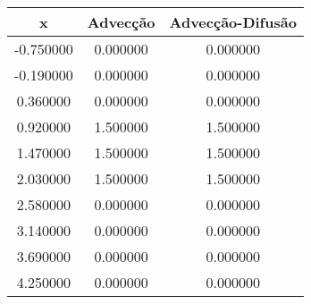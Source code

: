 \begin{tabular}{ccc}
\toprule
x & Advecção & Advecção-Difusão \\
\midrule
-0.750000 & 0.000000 & 0.000000 \\
-0.190000 & 0.000000 & 0.000000 \\
0.360000 & 0.000000 & 0.000000 \\
0.920000 & 1.500000 & 1.500000 \\
1.470000 & 1.500000 & 1.500000 \\
2.030000 & 1.500000 & 1.500000 \\
2.580000 & 0.000000 & 0.000000 \\
3.140000 & 0.000000 & 0.000000 \\
3.690000 & 0.000000 & 0.000000 \\
4.250000 & 0.000000 & 0.000000 \\
\bottomrule
\end{tabular}
